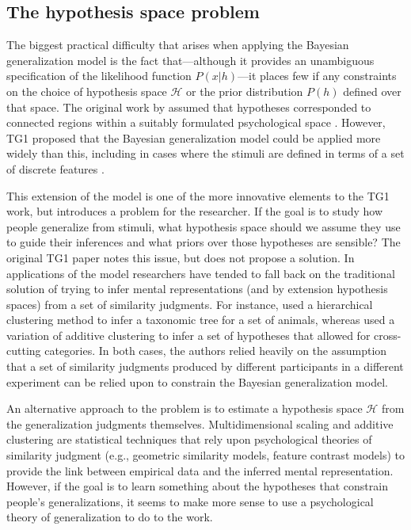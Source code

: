 \documentclass[doc,floatsintext]{apa6}
\begin{document}
\subsection{The hypothesis space problem}

The biggest practical difficulty that arises when applying the Bayesian generalization model is the fact that---although it provides an unambiguous specification of the likelihood function $P(x|h)$---it places few if any constraints on the choice of hypothesis space $\mathcal{H}$ or the prior distribution $P(h)$ defined over that space. The original work by  assumed that hypotheses corresponded to connected regions within a suitably formulated psychological space \cite<and estimated by multidimensional scaling or similar methods:>{torgerson_theory_1958,borg_modern_2005}. However, TG1 proposed that the Bayesian generalization model could be applied more widely than this, including in cases where the stimuli are defined in terms of a set of discrete features \cite<estimated using additive clustering or similar methods: >{shepard_additive_1979,lee_generating_2002,navarro2008}.

This extension of the model is one of the more innovative elements to the TG1 work, but introduces a problem for the researcher. If the goal is to study how people generalize from stimuli, what hypothesis space should we assume they use to guide their inferences and what priors over those hypotheses are sensible? The original TG1 paper notes this issue, but does not propose a solution. In applications of the model researchers have tended to fall back on the traditional solution of trying to infer mental representations (and by extension hypothesis spaces) from a set of similarity judgments. For instance,  used a hierarchical clustering method to infer a taxonomic tree for a set of animals, whereas  used a variation of additive clustering to infer a set of hypotheses that allowed for cross-cutting categories. In both cases, the authors relied heavily on the assumption that a set of similarity judgments produced by different participants in a different experiment can be relied upon to constrain the Bayesian generalization model.

An alternative approach to the problem is to estimate a hypothesis space $\mathcal{H}$ from the generalization judgments themselves. Multidimensional scaling and additive clustering are statistical techniques that rely upon psychological theories of similarity judgment (e.g., geometric similarity models, feature contrast models) to provide the link between empirical data and the inferred mental representation. However, if the goal is to learn something about the hypotheses that constrain people's generalizations, it seems to make more sense to use a psychological theory of generalization to do to the work.
\end{document}
